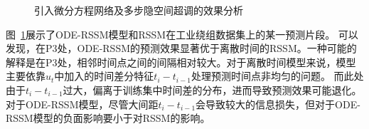 \begin{figure}[ht]
%
%
\centering
\caption{引入微分方程网络及多步隐空间超调的效果分析}
\label{fig:5_predict_cmp}
\end{figure}
图~\ref{fig:5_predict_cmp}展示了ODE-RSSM模型和RSSM在工业绕组数据集上的某一预测片段。
可以发现，在P3处，ODE-RSSM的预测效果显著优于离散时间的RSSM。一种可能的解释是在P3处，相邻时间点之间的间隔相对较大。对于离散时间模型来说，模型主要依靠$u_t$中加入的时间差分特征$t_{i}-t_{i-1}$处理预测时间点非均匀的问题。
而此处由于$t_{i}-t_{i-1}$过大，偏离于训练集中时间差的分布，进而导致预测效果可能退化。对于ODE-RSSM模型，尽管大间距$t_{i}-t_{i-1}$会导致较大的信息损失，但对于ODE-RSSM模型的负面影响要小于对RSSM的影响。

